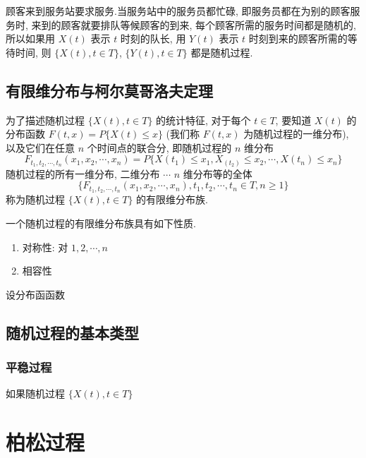 \documentclass[cn,toc=twocol]{elegantbook}
\newcommand{\ITEMS}{\begin{enumerate}}
\newcommand{\ITEME}{\end{enumerate}}
\begin{document}
\begin{example}[排队模型]
	顾客来到服务站要求服务.当服务站中的服务员都忙碌, 即服务员都在为别的顾客服务时, 来到的顾客就要排队等候顾客的到来, 每个顾客所需的服务时间都是随机的, 所以如果用 $X(t)$ 表示 $t$ 时刻的队长, 用 $Y(t)$ 表示 $t$ 时刻到来的顾客所需的等待时间, 则 $\{X(t), t\in T\}$,  $\{Y(t), t\in T\}$ 都是随机过程.
\end{example}

\section{有限维分布与柯尔莫哥洛夫定理}

为了描述随机过程 $\{X(t), t\in T\}$ 的统计特征, 对于每个 $t\in T$, 要知道 $X(t)$ 的分布函数 $F(t, x) = P\{X(t)\le x\}$ (我们称 $F(t, x)$ 为随机过程的一维分布), 以及它们在任意 $n$ 个时间点的联合分, 即随机过程的 $n$ 维分布
\[
	F_{t_1, t_2, \cdots, t_n}(x_1, x_2, \cdots, x_n) = P\{X(t_1) \le x_1, X_(t_2)\le x_2, \cdots, X(t_n)\le x_n\}
\]
随机过程的所有一维分布, 二维分布 $\cdots$ $n$ 维分布等的全体
\[
	\{F_{t_1, t_2, \cdots, t_n}(x_1, x_2, \cdots, x_n), t_1, t_2, \cdots, t_n\in T, n\ge1\}
\]
称为随机过程 $\{X(t), t\in T\}$ 的有限维分布族.

一个随机过程的有限维分布族具有如下性质.
\ITEMS
	\item 对称性: 对 $1, 2, \cdots, n$
	\item 相容性
\ITEME 
\begin{theorem}
	设分布函函数
\end{theorem}

\section{随机过程的基本类型}

\subsection{平稳过程}

如果随机过程 $\{X(t), t\in T\}$


\chapter{柏松过程}
\end{document}
